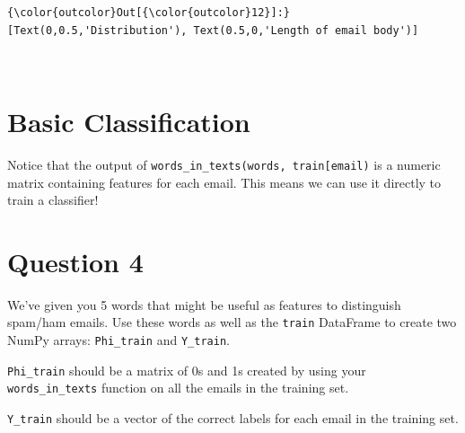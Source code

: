 \documentclass[11pt]{article}
\begin{document}
\begin{Verbatim}[commandchars=\\\{\}]
{\color{outcolor}Out[{\color{outcolor}12}]:} [Text(0,0.5,'Distribution'), Text(0.5,0,'Length of email body')]
\end{Verbatim}
            
    \begin{center}
    \end{center}
    { \hspace*{\fill} \\}
    
    \section{Basic Classification}\label{basic-classification}

Notice that the output of
\texttt{words\_in\_texts(words,\ train{[}\textquotesingle{}email\textquotesingle{}{]})}
is a numeric matrix containing features for each email. This means we
can use it directly to train a classifier!

    \section{Question 4}\label{question-4}

We've given you 5 words that might be useful as features to distinguish
spam/ham emails. Use these words as well as the \texttt{train} DataFrame
to create two NumPy arrays: \texttt{Phi\_train} and \texttt{Y\_train}.

\texttt{Phi\_train} should be a matrix of 0s and 1s created by using
your \texttt{words\_in\_texts} function on all the emails in the
training set.

\texttt{Y\_train} should be a vector of the correct labels for each
email in the training set.
\end{document}
